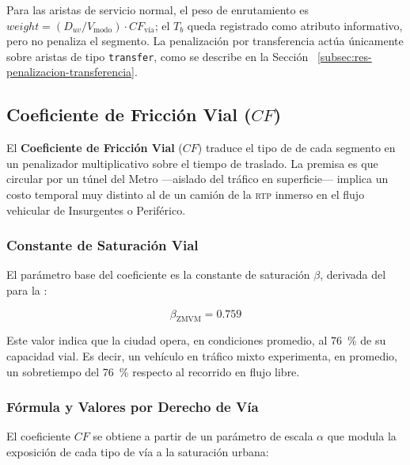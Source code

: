 Para las aristas de servicio normal, el peso de enrutamiento es
$\mathit{weight} = (D_{uv}/V_{\text{modo}}) \cdot CF_{\text{vía}}$; el $T_b$
queda registrado como atributo informativo, pero no penaliza el segmento. La
penalización por transferencia actúa únicamente sobre aristas de tipo
\texttt{transfer}, como se describe en la Sección~
\ref{subsec:res-penalizacion-transferencia}.

\subsection{Coeficiente de Fricción Vial (\texorpdfstring{$CF$}{CF})}
\label{subsec:coeficiente-friccion}

El \textbf{Coeficiente de Fricción Vial} ($CF$) traduce el tipo de
 de cada segmento en un penalizador multiplicativo sobre
el tiempo de traslado. La premisa es que circular por un túnel del Metro
—aislado del tráfico en superficie— implica un costo temporal muy distinto al de
un camión de la \textsc{rtp} inmerso en el flujo vehicular de Insurgentes o
Periférico.

\subsubsection{Constante de Saturación Vial}
\label{subsubsec:beta-saturacion}

El parámetro base del coeficiente es la constante de saturación $\beta$,
derivada del  para la \zmvm:

\begin{equation}
    \beta_{\text{ZMVM}} = 0.759
    \label{eq:beta-zmvm}
\end{equation}

Este valor indica que la ciudad opera, en condiciones promedio, al 76~\% de su
capacidad vial. Es decir, un vehículo en tráfico mixto experimenta, en promedio,
un sobretiempo del 76~\% respecto al recorrido en flujo libre.

\subsubsection{Fórmula y Valores por Derecho de Vía}
\label{subsubsec:formula-cf}

El coeficiente $CF$ se obtiene a partir de un parámetro de escala $\alpha$ que
modula la exposición de cada tipo de vía a la saturación urbana:

